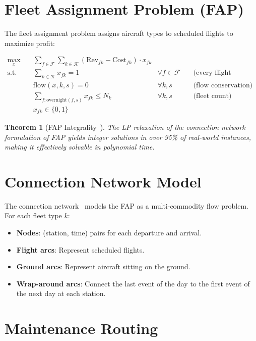 \documentclass[11pt,a4paper]{book}
\newtheorem{theorem}{Theorem}[chapter]
\theoremstyle{definition}
\begin{document}
\section{Fleet Assignment Problem (FAP)}

The fleet assignment problem assigns aircraft types to scheduled flights
to maximize profit:

\begin{align}
  \max_{x} \quad & \sum_{f \in \mathcal{F}} \sum_{k \in \mathcal{K}}
    (\text{Rev}_{fk} - \text{Cost}_{fk}) \cdot x_{fk} \\
  \text{s.t.} \quad
  & \sum_{k \in \mathcal{K}} x_{fk} = 1
    & \forall f \in \mathcal{F} \quad & \text{(every flight assigned)} \\
  & \text{flow}(x, k, s) = 0
    & \forall k, s \quad & \text{(flow conservation)} \\
  & \sum_{f: \text{overnight}(f,s)} x_{fk} \leq N_k
    & \forall k, s \quad & \text{(fleet count)} \\
  & x_{fk} \in \{0,1\} & &
\end{align}

\begin{theorem}[FAP Integrality~\cite{Hane1995}]
The LP relaxation of the connection network formulation of FAP yields
integer solutions in over 95\% of real-world instances, making it
effectively solvable in polynomial time.
\end{theorem}

\section{Connection Network Model}

The connection network~\cite{Hane1995} models the FAP as a multi-commodity
flow problem. For each fleet type $k$:
\begin{itemize}
  \item \textbf{Nodes}: (station, time) pairs for each departure and arrival.
  \item \textbf{Flight arcs}: Represent scheduled flights.
  \item \textbf{Ground arcs}: Represent aircraft sitting on the ground.
  \item \textbf{Wrap-around arcs}: Connect the last event of the day to the
    first event of the next day at each station.
\end{itemize}

\section{Maintenance Routing}
\end{document}
